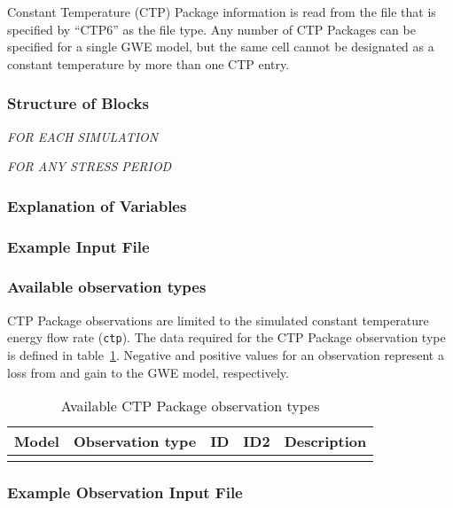 Constant Temperature (CTP) Package information is read from the file that is specified by ``CTP6'' as the file type.  Any number of CTP Packages can be specified for a single GWE model, but the same cell cannot be designated as a constant temperature by more than one CTP entry. 

\vspace{5mm}
\subsubsection{Structure of Blocks}
\vspace{5mm}

\noindent \textit{FOR EACH SIMULATION}


\vspace{5mm}
\noindent \textit{FOR ANY STRESS PERIOD}

\packageperioddescription

\vspace{5mm}
\subsubsection{Explanation of Variables}
\begin{description}

\end{description}

\vspace{5mm}
\subsubsection{Example Input File}


\vspace{5mm}
\subsubsection{Available observation types}
CTP Package observations are limited to the simulated constant temperature energy flow rate (\texttt{ctp}). The data required for the CTP Package observation type is defined in table~\ref{table:gwe-ctpobstype}. Negative and positive values for an observation represent a loss from and gain to the GWE model, respectively.

\begin{longtable}{p{2cm} p{2.75cm} p{2cm} p{1.25cm} p{7cm}}
\caption{Available CTP Package observation types} \tabularnewline

\hline
\hline
\textbf{Model} & \textbf{Observation type} & \textbf{ID} & \textbf{ID2} & \textbf{Description} \\
\hline
\endhead

\hline
\endfoot


\label{table:gwe-ctpobstype}
\end{longtable}

\vspace{5mm}
\subsubsection{Example Observation Input File}

